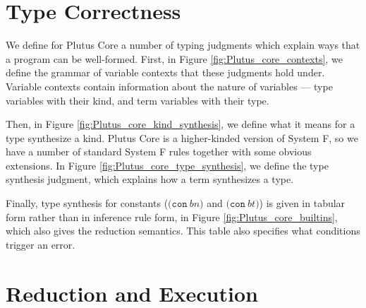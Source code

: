 \documentclass[conference]{IEEEtran}
\newcommand{\keyword}[1]{\texttt{#1}}
\newcommand{\construct}[1]{\texttt{(} #1 \texttt{)}}
\newcommand{\con}[1]{\construct{\keyword{con} ~ #1}}
\newcommand{\conT}[1]{\construct{\keyword{con} ~ #1}}
\begin{document}




%








\section{Type Correctness}

We define for Plutus Core a number of typing judgments which explain ways that a program can be well-formed. First, in Figure \ref{fig:Plutus_core_contexts}, we define the grammar of variable contexts that these judgments hold under. Variable contexts contain information about the nature of variables --- type variables with their kind, and term variables with their type.

Then, in Figure \ref{fig:Plutus_core_kind_synthesis}, we define what it means for a type synthesize a kind. Plutus Core is a higher-kinded version of System F, so we have a number of standard System F rules together with some obvious extensions. In Figure \ref{fig:Plutus_core_type_synthesis}, we define the type synthesis judgment, which explains how a term synthesizes a type.

Finally, type synthesis for constants ($\con{bn}$ and $\conT{bt}$) is given in tabular form rather than in inference rule form, in Figure \ref{fig:Plutus_core_builtins}, which also gives the reduction semantics. This table also specifies what conditions trigger an error.
















\section{Reduction and Execution}
\end{document}

